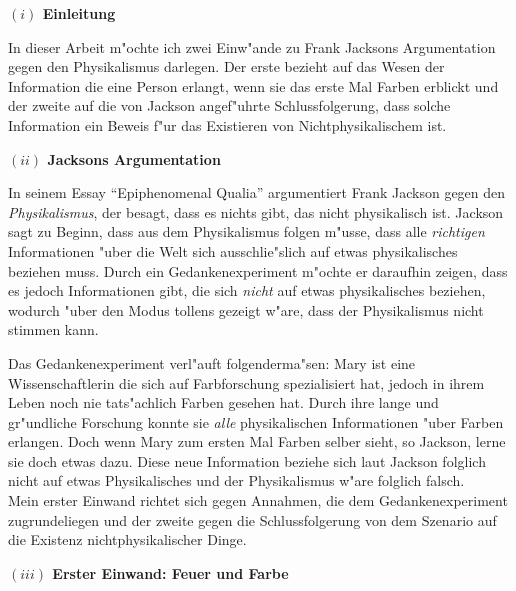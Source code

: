 \documentclass[a4paper, emulatestandardclasses, 12pt]{scrartcl}
\begin{document}
\begin{onehalfspace} 


\noindent\textbf{$(i)$ Einleitung}

\noindent In dieser Arbeit m"ochte ich zwei Einw"ande zu Frank Jacksons Argumentation gegen den Physikalismus darlegen. Der erste bezieht auf das Wesen der Information die eine Person erlangt, wenn sie das erste Mal Farben erblickt und der zweite auf die von Jackson angef"uhrte Schlussfolgerung, dass solche Information ein Beweis f"ur das Existieren von Nichtphysikalischem ist.

\vspace{2mm}

\noindent\textbf{$(ii)$ Jacksons Argumentation}

\noindent In seinem Essay "`Epiphenomenal Qualia"' \citep{jackson1982epiphenomenal} argumentiert Frank Jackson gegen den \emph{Physikalismus}, der besagt, dass es nichts gibt, das nicht physikalisch ist. Jackson sagt zu Beginn, dass aus dem Physikalismus folgen m"usse, dass alle \emph{richtigen} Informationen "uber die Welt sich ausschlie"slich auf etwas physikalisches beziehen muss. Durch ein Gedankenexperiment m"ochte er daraufhin zeigen, dass es jedoch Informationen gibt, die sich \emph{nicht} auf etwas physikalisches beziehen, wodurch "uber den Modus tollens gezeigt w"are, dass der Physikalismus nicht stimmen kann. 

Das Gedankenexperiment verl"auft folgenderma"sen: Mary ist eine Wissenschaftlerin die sich auf Farbforschung spezialisiert hat, jedoch in ihrem Leben noch nie tats"achlich Farben gesehen hat. Durch ihre lange und gr"undliche Forschung konnte sie \emph{alle} physikalischen Informationen "uber Farben erlangen. Doch wenn Mary zum ersten Mal Farben selber sieht, so Jackson, lerne sie doch etwas dazu. Diese neue Information beziehe sich laut Jackson folglich nicht auf etwas Physikalisches und der Physikalismus w"are folglich falsch.\\ 

\noindent Mein erster Einwand richtet sich gegen Annahmen, die dem Gedankenexperiment zugrundeliegen und der zweite gegen die Schlussfolgerung von dem Szenario auf die Existenz nichtphysikalischer Dinge. 

\vspace{5mm}
\noindent\textbf{$(iii)$ Erster Einwand: Feuer und Farbe}


\end{onehalfspace}
\end{document}
